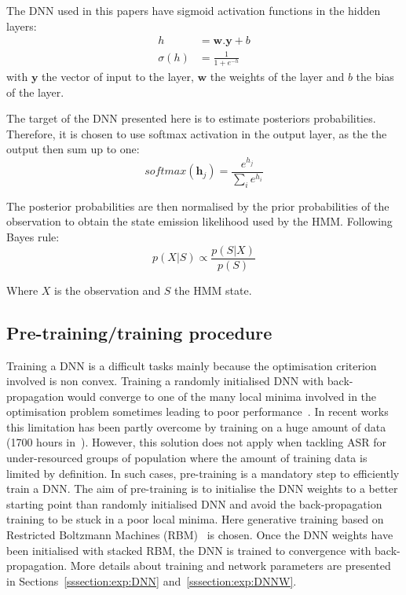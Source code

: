 \documentclass{nle}
\begin{document}
The DNN used in this papers have sigmoid activation functions in the hidden layers:
\begin{align}
h & = \textbf{w}.\textbf{y} + b\nonumber\\
  \sigma(h) & = \frac{1}{1+ e^{-h} }\nonumber
\end{align}
with $\textbf{y}$ the vector of input to the layer, $\textbf{w}$ the weights of the layer and $b$ the bias of the layer.

The target of the DNN presented here is to estimate posteriors probabilities. Therefore, it is chosen to use softmax activation in the output layer, as the the output then sum up to one:
\begin{equation}
 softmax(\textbf{h}_j)=\frac{e^{h_j}}{\sum\limits_i e^{h_i}}\nonumber
\end{equation}

The posterior probabilities are then normalised by the prior probabilities of the observation to obtain the state emission likelihood used by the HMM. Following Bayes rule:
\begin{equation}
 p(X|S)\propto \frac{p(S|X)}{p(S)} \nonumber
\end{equation}

Where $X$ is the observation and $S$ the HMM state.

\subsection{Pre-training/training procedure}
Training a DNN is a difficult tasks mainly because the optimisation criterion involved is non convex. Training a randomly initialised DNN with back-propagation would converge to one of the many local minima involved in the optimisation problem sometimes leading to poor performance~\citep{erhan10}. In recent works this limitation has been partly overcome by training on a huge amount of data (1700 hours in~\citet{42536}). However, this solution does not apply when tackling ASR for under-resourced groups of population where the amount of training data is limited by definition. In such cases, pre-training is a mandatory step to efficiently train a DNN. The aim of pre-training is to initialise the DNN weights to a better starting point than randomly initialised DNN and avoid the back-propagation training to be stuck in a poor local minima. Here generative training based on Restricted Boltzmann Machines (RBM)~\citep{hinton06,erhan10} is chosen. Once the DNN weights have been initialised with stacked RBM, the DNN is trained to convergence with back-propagation. More details about training and network parameters are presented in Sections~\ref{sssection:exp:DNN} and~\ref{sssection:exp:DNNW}.
\end{document}
